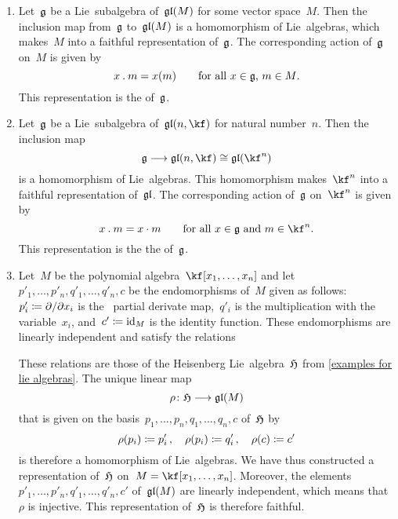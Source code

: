 \begin{examples}
	\label{examples for representations}
	\leavevmode
	\begin{enumerate}
		\item
			Let~$\mathfrak{g}$ be a Lie~subalgebra of~$\mathfrak{gl}(M)$ for some vector space~$M$.
			Then the inclusion map from~$\mathfrak{g}$ to~$\mathfrak{gl}(M)$ is a homomorphism of Lie~algebras, which makes~$M$ into a faithful representation of~$\mathfrak{g}$.
			The corresponding action of~$\mathfrak{g}$ on~$M$ is given by
			\[
				x \mathbin{.} m
				=
				x(m)
				\qquad
				\text{for all~$x \in \mathfrak{g}$,~$m \in M$.}
			\]
			This representation is the  of~$\mathfrak{g}$.
		\item
			Let~$\mathfrak{g}$ be a Lie~subalgebra of~$\gllie(n, \kf)$ for natural number~$n$.
			Then the inclusion map
			\[
				\glie
				\to
				\gllie(n, \kf)
				\cong
				\gllie(\kf^n)
			\]
			is a homomorphism of Lie~algebras.
			This homomorphism makes~$\kf^n$ into a faithful representation of~$\mathfrak{gl}$.
			The corresponding action of~$\mathfrak{g}$ on~$\kf^n$ is given by
			\[
				x \act m
				=
				x \cdot m
				\qquad
				\text{for all~$x \in \glie$ and~$m \in \kf^n$.}
			\]
			This representation is the the  of~$\mathfrak{g}$.
		\item
			Let~$M$ be the polynomial algebra~$\kf[x_1, \dotsc, x_n]$ and let~$p'_1, \dotsc, p'_n, q'_1, \dotsc, q'_n, c$ be the endomorphisms of~$M$ given as follows:
			$p'_i \defined \dd{x_i}$ is the~{} partial derivate map,~$q'_i$ is the multiplication with the variable~$x_i$, and~$c' \coloneqq \mathrm{id}_M$ is the identity function.
			These endomorphisms are linearly independent and satisfy the relations
			These relations are those of the Heisenberg Lie~algebra~$\mathfrak{H}$ from \cref{examples for lie algebras}.
			The unique linear map
			\[
				\rho
				\colon
				\heisenberglie
				\to
				\gllie(M)
			\]
			that is given on the basis~$p_1, \dotsc, p_n, q_1, \dotsc, q_n, c$ of~$\mathfrak{H}$ by
			\[
				\rho(p_i) \coloneqq p'_i \,,
				\quad
				\rho(p_i) \coloneqq q'_i \,,
				\quad
				\rho(c) \coloneqq c'
			\]
			is therefore a homomorphism of Lie~algebras.
			We have thus constructed a representation of~$\mathfrak{H}$ on~$M = \kf[x_1, \dotsc, x_n]$.
			Moreover, the elements~$p'_1, \dotsc, p'_n, q'_1, \dotsc, q'_n, c'$ of~$\mathfrak{gl}(M)$ are linearly independent, which means that~$\rho$ is injective.
			This representation of~$\mathfrak{H}$ is therefore faithful.


\end{enumerate}
\end{examples}
